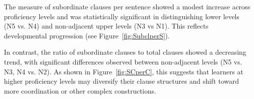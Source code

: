 
The measure of subordinate clauses per sentence showed a modest increase across proficiency levels and was
statistically significant in distinguishing lower levels (N5 vs. N4) and non-adjacent upper levels (N3 vs N1). This
reflects developmental progression (see Figure~\ref{fig:SubclperS}).

In contrast, the ratio of subordinate clauses to total clauses showed a decreasing trend, with significant
differences observed between non-adjacent levels (N5 vs. N3, N4 vs. N2).  As shown in Figure~\ref{fig:SCperC}, this
suggests that learners at higher proficiency levels may diversify their clause structures and shift toward more
coordination or other complex constructions.

